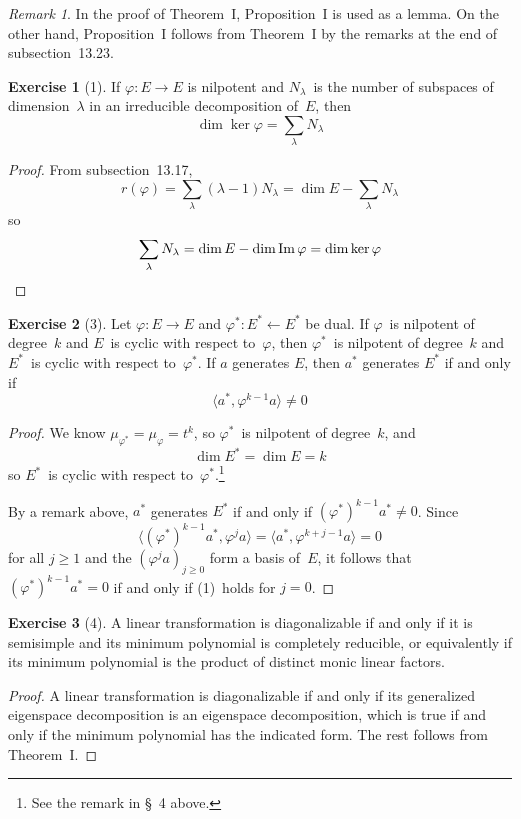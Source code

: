 \documentclass[letterpaper,12pt]{article}
\newcommand{\from}{\leftarrow}
\DeclareMathOperator{\im}{Im}
\newcommand{\sprod}[2]{\langle#1,#2\rangle}
\theoremstyle{definition}
\newtheorem*{exer}{Exercise}
\theoremstyle{remark}
\newtheorem*{rmk}{Remark}
\begin{document}
\begin{rmk}
In the proof of Theorem~I, Proposition~I is used as a lemma. On the other hand, Proposition~I follows from Theorem~I by the remarks at the end of subsection~13.23.
\end{rmk}

\begin{exer}[1]
If \(\varphi:E\to E\) is nilpotent and \(N_{\lambda}\)~is the number of subspaces of dimension~\(\lambda\) in an irreducible decomposition of~\(E\), then
\[\dim\ker\varphi=\sum_{\lambda}N_{\lambda}\]
\end{exer}
\begin{proof}
From subsection~13.17,
\[r(\varphi)=\sum_{\lambda}(\lambda-1)N_{\lambda}=\dim E-\sum_{\lambda}N_{\lambda}\]
so
\[\sum_{\lambda}N_{\lambda}=\dim E-\dim\im\varphi=\dim\ker\varphi\qedhere\]
\end{proof}

\begin{exer}[3]
Let \(\varphi:E\to E\) and \(\varphi^*:E^*\from E^*\) be dual. If \(\varphi\)~is nilpotent of degree~\(k\) and \(E\)~is cyclic with respect to~\(\varphi\), then \(\varphi^*\)~is nilpotent of degree~\(k\) and \(E^*\)~is cyclic with respect to~\(\varphi^*\). If \(a\) generates \(E\), then \(a^*\) generates \(E^*\) if and only if
\[\sprod{a^*}{\varphi^{k-1}a}\ne0\]
\end{exer}
\begin{proof}
We know \(\mu_{\varphi^*}=\mu_{\varphi}=t^k\), so \(\varphi^*\)~is nilpotent of degree~\(k\), and
\[\dim E^*=\dim E=k\]
so \(E^*\)~is cyclic with respect to~\(\varphi^*\).\footnote{See the remark in \S~4 above.}

By a remark above, \(a^*\) generates \(E^*\) if and only if \((\varphi^*)^{k-1}a^*\ne0\). Since
\[\sprod{(\varphi^*)^{k-1}a^*}{\varphi^j a}=\sprod{a^*}{\varphi^{k+j-1}a}=0\tag{1}\]
for all \(j\ge 1\) and the \((\varphi^j a)_{j\ge 0}\) form a basis of~\(E\), it follows that \((\varphi^*)^{k-1}a^*=0\) if and only if (1)~holds for \(j=0\).
\end{proof}

\begin{exer}[4]
A linear transformation is diagonalizable if and only if it is semi\-simple and its minimum polynomial is completely reducible, or equivalently if its minimum polynomial is the product of distinct monic linear factors.
\end{exer}
\begin{proof}
A linear transformation is diagonalizable if and only if its generalized eigenspace decomposition is an eigenspace decomposition, which is true if and only if the minimum polynomial has the indicated form. The rest follows from Theorem~I.
\end{proof}
\end{document}
